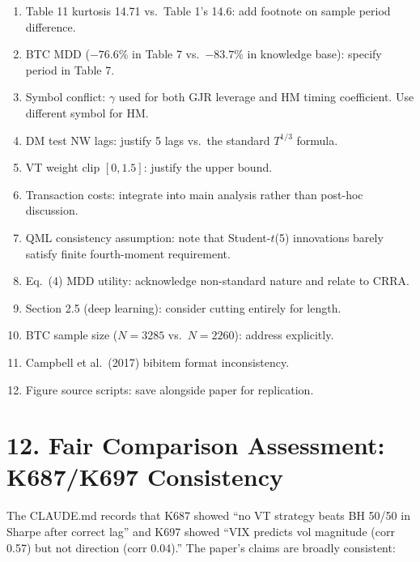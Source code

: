 \documentclass[12pt,a4paper]{article}
\begin{document}
\begin{enumerate}[label=m\arabic*.]
\item Table 11 kurtosis 14.71 vs.\ Table 1's 14.6: add footnote on sample period difference.
\item BTC MDD ($-76.6\%$ in Table 7 vs.\ $-83.7\%$ in knowledge base): specify period in Table 7.
\item Symbol conflict: $\gamma$ used for both GJR leverage and HM timing coefficient. Use different symbol for HM.
\item DM test NW lags: justify 5 lags vs.\ the standard $T^{1/3}$ formula.
\item VT weight clip $[0, 1.5]$: justify the upper bound.
\item Transaction costs: integrate into main analysis rather than post-hoc discussion.
\item QML consistency assumption: note that Student-$t$(5) innovations barely satisfy finite fourth-moment requirement.
\item Eq.~(4) MDD utility: acknowledge non-standard nature and relate to CRRA.
\item Section 2.5 (deep learning): consider cutting entirely for length.
\item BTC sample size ($N = 3285$ vs.\ $N = 2260$): address explicitly.
\item Campbell et al.\ (2017) bibitem format inconsistency.
\item Figure source scripts: save alongside paper for replication.
\end{enumerate}

\bigskip

\section*{12. Fair Comparison Assessment: K687/K697 Consistency}

The CLAUDE.md records that K687 showed ``no VT strategy beats BH 50/50 in Sharpe after correct lag'' and K697 showed ``VIX predicts vol magnitude (corr 0.57) but not direction (corr 0.04).'' The paper's claims are broadly consistent:
\end{document}

